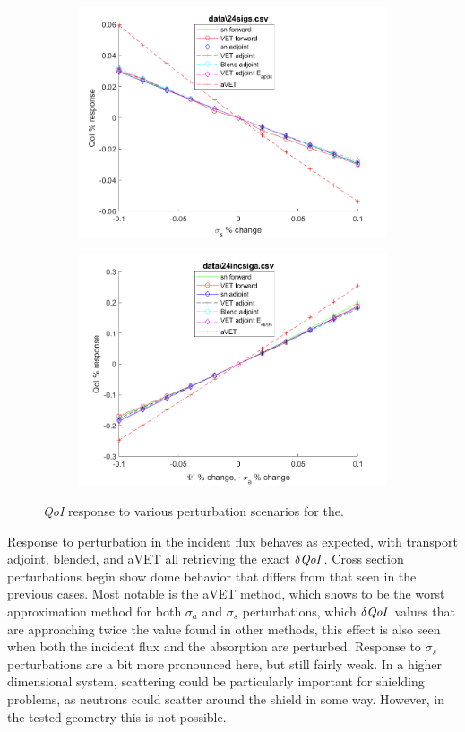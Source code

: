 \documentclass[12pt]{report}
\newcommand{\sigs}{\sigma_s}
\newcommand{\siga}{\sigma_a}
\newcommand{\qoi}{{\it QoI}\xspace}
\begin{document}
\begin{figure}[H]
\begin{subfigure}{.5\textwidth}
  \includegraphics[width=.98\linewidth]{figures2/24sigsSens.png}
\end{subfigure}%
\begin{subfigure}{.5\textwidth}
  \centering
  \includegraphics[width=.98\linewidth]{figures2/24incsigaSens.png}
\end{subfigure}
\caption{\qoi response to various perturbation scenarios for the.}
\label{fig:Trial3}
\end{figure}

Response to perturbation in the incident flux behaves as expected, with transport adjoint, blended, and aVET all retrieving the exact $\delta \qoi$. Cross section perturbations begin show dome behavior that differs from that seen in the previous cases. Most notable is the aVET method, which shows to be the worst approximation method for both $\siga$ and $\sigs$ perturbations, which $\delta \qoi$ values that are approaching twice the value found in other methods, this effect is also seen when both the incident flux and the absorption are perturbed. Response to $\sigs$ perturbations are a bit more pronounced here, but still fairly weak. In a higher dimensional system, scattering could be particularly important for shielding problems, as neutrons could scatter around the shield in some way. However, in the tested geometry this is not possible.
\end{document}

